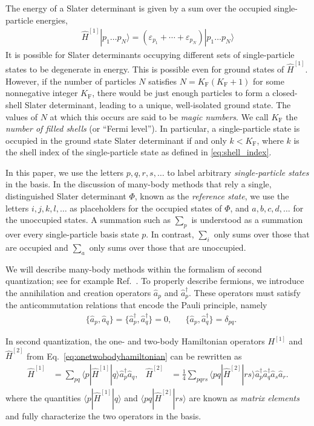 The energy of a Slater determinant is given by a sum over the occupied single-particle energies,
\begin{align*}
  \hat{H}^{[1]} | p_1 \ldots p_N \rangle = (\varepsilon_{p_1} + \cdots + \varepsilon_{p_N}) | p_1 \ldots p_N \rangle
\end{align*}
It is possible for Slater determinants occupying different sets of single-particle states to be degenerate in energy.  This is possible even for ground states of $\hat{H}^{[1]}$.  However, if the number of particles $N$ satisfies $N = K_{\mathrm{F}} (K_{\mathrm{F}} + 1)$ for some nonnegative integer $K_{\mathrm{F}}$, there would be just enough particles to form a closed-shell Slater determinant, leading to a unique, well-isolated ground state.  The values of $N$ at which this occurs are said to be \textit{magic numbers}.  We call $K_{\mathrm{F}}$ the \textit{number of filled shells} (or ``Fermi level'').  In particular, a single-particle state is occupied in the ground state Slater determinant if and only $k < K_{\mathrm{F}}$, where $k$ is the shell index of the single-particle state as defined in \eqref{eq:shell_index}.

In this paper, we use the letters $p, q, r, s, \ldots$ to label arbitrary \textit{single-particle states} in the basis.  In the discussion of many-body methods that rely a single, distinguished Slater determinant $\Phi$, known as the \textit{reference state}, we use the letters $i, j, k, l, \ldots$ as placeholders for the occupied states of $\Phi$, and $a, b, c, d, \ldots$ for the unoccupied states.  A summation such as $\sum_p$ is understood as a summation over every single-particle basis state $p$.  In contrast, $\sum_i$ only sums over those that are occupied and $\sum_a$ only sums over those that are unoccupied.

We will describe many-body methods within the formalism of second quantization; see for example Ref.\ \cite{shavitt2009many}.  To properly describe fermions, we introduce the annihilation and creation operators $\hat a_p$ and $\hat a_p^\dagger$. These operators must satisfy the anticommutation relations that encode the Pauli principle, namely
\begin{align*}
  &\{\hat a_p, \hat a_q\} = \{\hat a_p^\dagger, \hat a_q^\dagger\} = 0, &
  &\{\hat a_p, \hat a_q^\dagger\} = \delta_{p q}.
\end{align*}

In second quantization, the one- and two-body Hamiltonian operators $H^{[1]}$ and $\hat{H}^{[2]}$ from Eq.\ \eqref{eq:onetwobodyhamiltonian} can be rewritten as
\begin{align} \label{eq:second_quantized_hamiltonian}
  \hat H^{[1]} &= \sum_{p q} \langle p | \hat{H}^{[1]} | q \rangle \hat a_p^\dagger \hat a_q^{}, &
  \hat{H}^{[2]} &= \frac{1}{4} \sum_{p q r s} \langle p q | \hat{H}^{[2]} | r s \rangle \hat a_p^\dagger \hat a_q^\dagger \hat a_s^{} \hat a_r^{}.
\end{align}
where the quantities $\langle p | \hat{H}^{[1]} | q \rangle$ and $\langle p q | \hat{H}^{[2]} | r s \rangle$ are known as \textit{matrix elements} and fully characterize the two operators in the basis.

